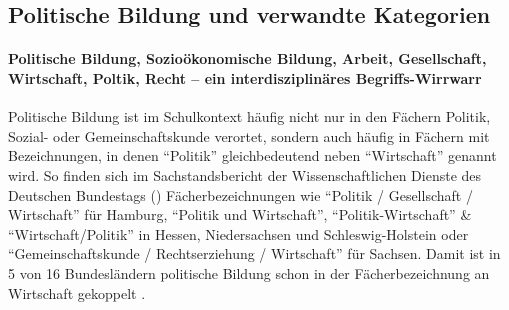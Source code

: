 







\subsection{Politische Bildung und verwandte Kategorien \label{polBildung}}
\paragraph{Politische Bildung, Sozioökonomische Bildung, Arbeit, Gesellschaft, Wirtschaft, Poltik, Recht -- ein interdisziplinäres Begriffs-Wirrwarr} 
Politische Bildung %
ist im Schulkontext häufig nicht nur in den Fächern Politik, Sozial- oder Gemeinschaftskunde verortet, sondern auch häufig in Fächern mit Bezeichnungen, in denen \enquote{Politik} gleichbedeutend neben \enquote{Wirtschaft} genannt wird. 
So finden sich im Sachstandsbericht der Wissenschaftlichen Dienste des Deutschen Bundestags (\citeyear[5]{WD8.2016}) Fächerbezeichnungen wie \enquote{Politik / Gesellschaft / Wirtschaft} für Hamburg, \enquote{Politik und Wirtschaft}, \enquote{Politik-Wirtschaft} \& \enquote{Wirtschaft/Politik} in Hessen, Niedersachsen und Schleswig-Holstein oder \enquote{Gemeinschaftskunde / Rechtserziehung / Wirtschaft} für Sachsen. Damit ist in 5 von 16 Bundesländern politische Bildung schon in der Fächerbezeichnung an Wirtschaft gekoppelt \autocite[vgl. zu der tatsächlichen Zeit, die für politische Bildung im Unterricht an allgemeinbildenden Schulen zur Verfügung steht auch][14 \& 16]{Gokbudak2020}.

